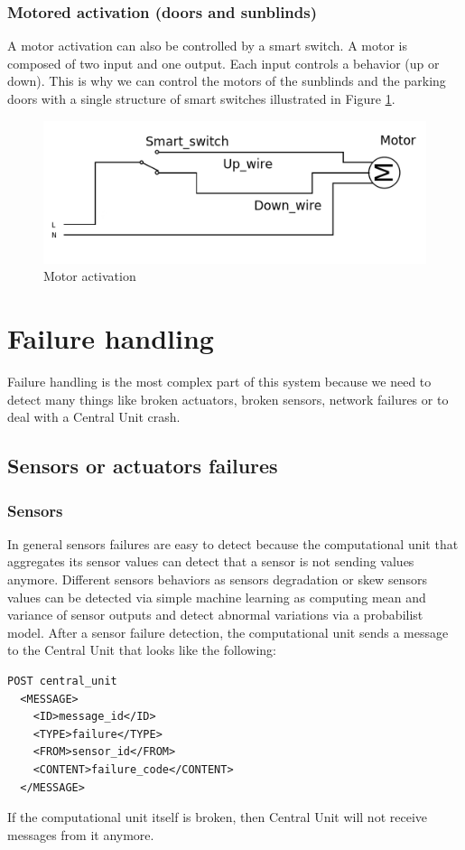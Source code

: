\documentclass{acm_proc_article-sp}
\begin{document}
\subsubsection{Motored activation (doors and sunblinds)}
A motor activation can also be controlled by a smart switch.
A motor is composed of two input and one output. Each input controls a behavior (up or down).
This is why we can control the motors of the sunblinds and the parking doors with a single structure of smart switches illustrated in Figure \ref{motor}.
				\begin{figure}[htb]
  				\begin{center}
    				\includegraphics[width=\linewidth]{motor}
    				\caption{Motor activation \label{motor}}
  				\end{center}
				\end{figure}

\section{Failure handling}\label{failure_handling}
Failure handling is the most complex part of this system because we need to detect many things like broken actuators, broken sensors, 
network failures or to deal with a Central Unit crash.
\subsection{Sensors or actuators failures}
\subsubsection{Sensors}
In general sensors failures are easy to detect because the computational unit that aggregates its sensor values can detect that a sensor is not sending values anymore. 
Different sensors behaviors as sensors degradation or skew sensors values can be detected via simple machine learning as computing mean and variance of sensor outputs and detect abnormal variations via a probabilist model.
After a sensor failure detection, the computational unit sends a message to the Central Unit that looks like the following: 
\begin{verbatim}
POST central_unit 
  <MESSAGE>
    <ID>message_id</ID>
    <TYPE>failure</TYPE>
    <FROM>sensor_id</FROM>
    <CONTENT>failure_code</CONTENT>
  </MESSAGE>
\end{verbatim}
If the computational unit itself is broken, then Central Unit will not receive messages from it anymore.
\end{document}
